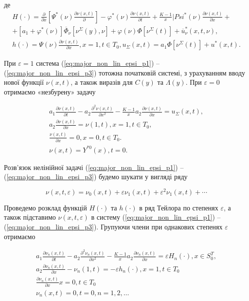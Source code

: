 де
\begin{gather*}
H(\cdot) = \frac{\partial}{\partial x} \left[\Psi^*(\nu)\frac{\partial\nu(x, t)}{\partial} \right] -
\varphi^*(\nu)\frac{\partial\nu(x, t)}{\partial t} +
\frac{K - 1}{x}|Psi^*(\nu)\frac{\partial\nu(x, t)}{\partial x} + \\
+ [a_1 + \varphi^*(\nu)]\overline{\Phi}_\nu[\nu^\Sigma(y), \nu] +
\varphi(\nu)\Phi[\nu^\Sigma(t)] + \overline{u}_\nu^*(x, t, \nu), \\
h(\cdot) = \Psi(\nu)\frac{\partial\nu(x, t)}{\partial x},
x = 1, t \in T_0, u_\Sigma(x, t) = a_1\Phi[\nu^\Sigma(t)] + u^*(x, t).
\end{gather*}


При $\varepsilon = 1$ система (\ref{eq:major_non_lin_epsi_p1}) – (\ref{eq:major_non_lin_epsi_p3}) тотожна
початковій системі, з урахуванням вводу нової функції $\nu(x, t)$,
а також виразів для $C(y)$ та $\Lambda(y)$. При $\varepsilon = 0$ отримаємо «незбурену» задачу

\begin{gather*}
a_1\frac{\partial\nu(x, t)}{\partial t} - a_2\frac{\partial^2\nu(x, t)}{\partial x^2} - \frac{K - 1}{x}a_2
\frac{\partial\nu(x, t)}{\partial x} = u_\Sigma(x, t), \\
a_2\frac{\partial\nu(x, t)}{\partial x}  = \nu(1, t), x = 1, t \in T_0,\\
\frac{\nu(x, t)}{\partial x} = 0, x = 0, t \in T_0. \\
\nu(x, t) = Y^{*0}(x), t = 0.
\end{gather*}

Розв’язок нелінійної задачі (\ref{eq:major_non_lin_epsi_p1}) – (\ref{eq:major_non_lin_epsi_p3})
будемо шукати у вигляді ряду \cite{Mitropolskiy-Leksii}

$$
\nu(x,t, \varepsilon) = \nu_0(x, t) + \varepsilon\nu_1(x, t) + \varepsilon^2\nu_1(x, t) + \cdots
$$

Проведемо розклад функцій $H(\cdot)$ та $h(\cdot)$ в ряд Тейлора по степенях $\varepsilon$,
а також підставимо $\nu(x, t, \varepsilon)$ в систему
(\ref{eq:major_non_lin_epsi_p1}) – (\ref{eq:major_non_lin_epsi_p3}).
Групуючи члени при однакових степенях $\varepsilon$ отримаємо

\begin{gather*}
a_1\frac{\partial\nu_n(x, t)}{\partial t} - a_2\frac{\partial^2\nu_n(x, t)}{\partial x^2} -
\frac{K - 1}{x}a_2\frac{\partial\nu_n(x, t)}{\partial x} = \varepsilon H_n(\cdot), x\in S_0^T, \\
a_2\frac{\partial\nu_n(x, t)}{\partial x} - \nu_n(1, t) = -\varepsilon h_n(\cdot), x = 1, t\in T_0 \\
\frac{\partial\nu_n(x, t)}{\partial x} x = 0, t\in T_0 \\
\nu_n(x, t) = 0, t = 0, n = 1,2,\ldots
\end{gather*}

